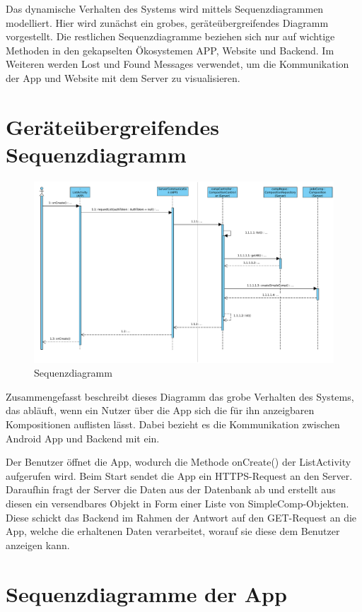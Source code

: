 	Das dynamische Verhalten des Systems wird mittels Sequenzdiagrammen modelliert.
	Hier wird zunächst ein grobes, geräteübergreifendes Diagramm vorgestellt.
	Die restlichen Sequenzdiagramme beziehen sich nur auf wichtige Methoden in den gekapselten Ökosystemen APP, Website und Backend. Im Weiteren werden Lost und Found Messages verwendet, um die Kommunikation der App und Website mit dem Server zu visualisieren. 
	
\section*{Geräteübergreifendes Sequenzdiagramm}

\begin{figure}[h]
	\centering
	\includegraphics[width=\textwidth]{img/Diagramme/Sequenz/Overview}
	\caption{Sequenzdiagramm}
	\label{fig:sequenz-overview}
\end{figure}
\noindent
Zusammengefasst beschreibt dieses Diagramm das grobe Verhalten des Systems, das abläuft, wenn ein Nutzer über die App sich die für ihn anzeigbaren Kompositionen auflisten lässt. Dabei bezieht es die Kommunikation zwischen Android App und Backend mit ein.\newline

\noindent Der Benutzer öffnet die App, wodurch die Methode onCreate() der ListActivity aufgerufen wird. Beim Start sendet die App ein HTTPS-Request an den Server. Daraufhin fragt der Server die Daten aus der Datenbank ab und erstellt aus diesen ein versendbares Objekt in Form einer Liste von SimpleComp-Objekten. Diese schickt das Backend im Rahmen der Antwort auf den GET-Request an die App, welche die erhaltenen Daten verarbeitet, worauf sie diese dem Benutzer anzeigen kann.

\section*{Sequenzdiagramme der App}
